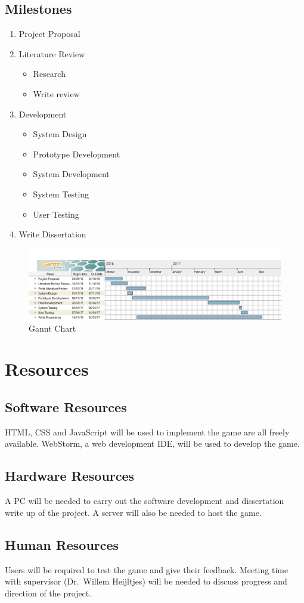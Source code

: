 \documentclass[12pt,a4paper]{report}
\begin{document}
\section{Milestones}
\begin{enumerate}
  \item Project Proposal
  \item Literature Review
  \begin{itemize}
  \item Research
  \item Write review
  \end{itemize}
  \item Development
  \begin{itemize}
  \item System Design
  \item Prototype Development
  \item System Development
  \item System Testing
  \item User Testing
  \end{itemize}
  \item Write Dissertation
\end{enumerate}

\begin{figure}[h]
\caption{Gannt Chart}
\centering
\label{fig:ganntchart}
\includegraphics[width=\textwidth,height=\textheight,keepaspectratio]{Gantt}
\end{figure}



{\let\clearpage\relax\chapter{Resources}}
\section{Software Resources}
HTML, CSS and JavaScript will be used to implement the game are all freely available. WebStorm, a web development IDE, will be used to develop the game.

\section{Hardware Resources}
A PC will be needed to carry out the software development and dissertation write up of the project. A server will also be needed to host the game.

\section{Human Resources}
Users will be required to test the game and give their feedback. 
Meeting time with supervisor (Dr.~Willem Heijltjes) will be needed to discuss progress and direction of the project.


 
\end{document}

